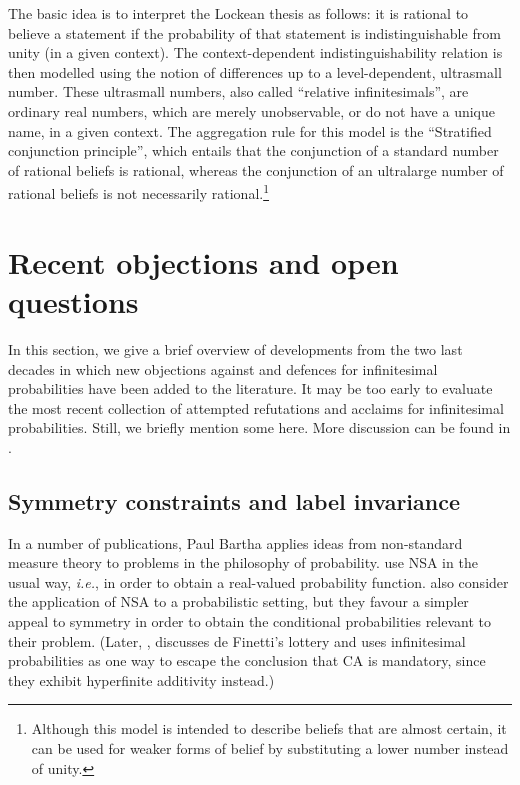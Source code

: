 The basic idea is to interpret the Lockean thesis as follows: it is rational to believe a statement if the probability of that statement is indistinguishable from unity (in a given context). The context-dependent indistinguishability relation is then modelled using the notion of differences up to a level-dependent, ultrasmall number. These ultrasmall numbers, also called ``relative infinitesimals'', are ordinary real numbers, which are merely unobservable, or do not have a unique name, in a given context. The aggregation rule for this model is the ``Stratified conjunction principle'', which entails that the conjunction of a standard number of rational beliefs is rational, whereas the conjunction of an ultralarge number of rational beliefs is not necessarily rational.\footnote{Although this model is intended to describe beliefs that are almost certain, it can be used for weaker forms of belief by substituting a lower number instead of unity.}

\section{Recent objections and open questions}\label{sec:objections}
In this section, we give a brief overview of developments from the two last decades in which new objections against and defences for infinitesimal probabilities have been added to the literature. It may be too early to evaluate the most recent collection of attempted refutations and acclaims for infinitesimal probabilities. Still, we briefly mention some here. More discussion can be found in \citet{Benci_etal:2018}.

\subsection{Symmetry constraints and label invariance}\label{sec:symm}
In a number of publications, Paul Bartha applies ideas from non-standard measure theory to problems in the philosophy of probability.
\citet{BarthaHitchcock:1999} use NSA in the usual way, \textit{i.e.}, in order to obtain a real-valued probability function.
\citet{BarthaJohns:2001} also consider the application of NSA to a probabilistic setting, but they favour a simpler appeal to symmetry in order to obtain the conditional probabilities relevant to their problem.
(Later, \citealp{Bartha:2004}, discusses de Finetti's lottery and uses infinitesimal probabilities as one way to escape the conclusion that CA is mandatory, since they exhibit hyperfinite additivity instead.)

